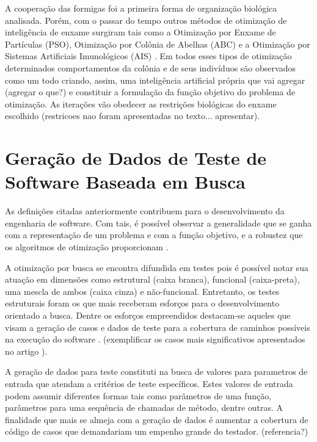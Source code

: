 A cooperação das formigas foi a primeira forma de organização biológica analisada. Porém, com o passar do tempo  outros métodos de otimização de inteligência de enxame surgiram tais como a Otimização por Enxame de Partículas (PSO), Otimização por Colônia de Abelhas (ABC) e a Otimização por Sistemas Artificiais Imunológicos (AIS) \cite{blum2008swarm}. Em todos esses tipos de otimização determinados comportamentos da colônia e de seus indivíduos são observados como um todo criando, assim, uma inteligência artificial própria que vai agregar (agregar o que?) e constituir a formulação da função objetivo do problema de otimização. As iterações vão obedecer as restrições biológicas do enxame escolhido (restricoes nao foram apresentadas no texto... apresentar).

\section{Geração de Dados de Teste de Software Baseada em Busca \label{sec:trabsSBST}}

As definições citadas anteriormente contribuem para o desenvolvimento da engenharia de software. Com tais, é possível observar a generalidade que se ganha com a representação de um problema e com a função objetivo, e a robustez que os algoritmos de otimização proporcionam \cite{harman2012search}. 


A otimização por busca se encontra difundida em testes pois é possível notar sua atuação em dimensões como estrutural (caixa branca), funcional (caixa-preta), uma mescla de ambos (caixa cinza) e não-funcional.  Entretanto, os testes estruturais foram os que mais receberam esforços para o desenvolvimento orientado a busca. Dentre os esforços empreendidos destacam-se aqueles que visam a geração de casos e dados de teste para a cobertura de caminhos possíveis na execução do software \cite{khari2017extensive}. (exemplificar os casos mais significativos apresentados no artigo \cite{khari2017extensive}).

A geração de dados para teste constituti na busca de valores para parametros de entrada que atendam a critérios de teste específicos. Estes valores de entrada podem assumir diferentes formas tais como parâmetros de uma função, parâmetros para uma sequência de chamadas de método, dentre outras. A finalidade que mais se almeja com a geração de dados é aumentar a cobertura de código de casos que demandariam um empenho grande do testador. (referencia?)

